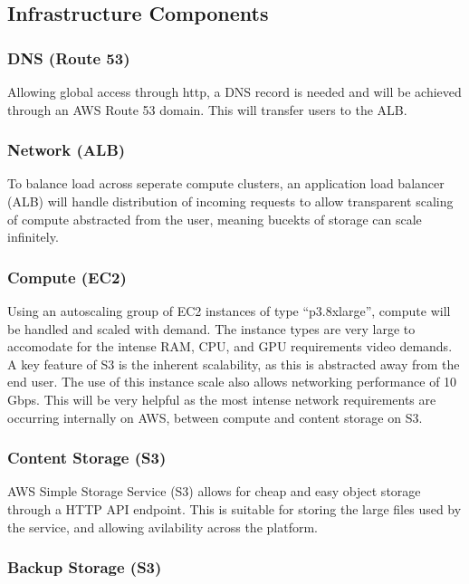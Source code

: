 \subsection{Infrastructure Components}
\label{sec:infrastructure-components}

\subsubsection*{DNS (Route 53)}

Allowing global access through http, a DNS record is needed and will be achieved through an AWS Route 53 domain. This will transfer users to the ALB.

\subsubsection*{Network (ALB)}

To balance load across seperate compute clusters, an application load balancer (ALB) will handle distribution of incoming requests to allow transparent scaling of compute abstracted from the user, meaning bucekts of storage can scale infinitely.

\subsubsection*{Compute (EC2)}

Using an autoscaling group of EC2 instances of type ``p3.8xlarge'', compute will be handled and scaled with demand. The instance types are very large to accomodate for the intense RAM, CPU, and GPU requirements video demands. A key feature of S3 is the inherent scalability, as this is abstracted away from the end user. The use of this instance scale also allows networking performance of 10 Gbps. This will be very helpful as the most intense network requirements are occurring internally on AWS, between compute and content storage on S3.

\subsubsection*{Content Storage (S3)}

AWS Simple Storage Service (S3) allows for cheap and easy object storage through a HTTP API endpoint. This is suitable for storing the large files used by the service, and allowing avilability across the platform.

\subsubsection*{Backup Storage (S3)}

